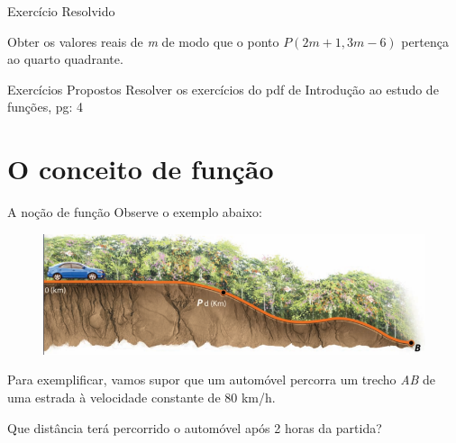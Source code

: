 \documentclass[aspectratio=169,xcolor=dvipsnames]{beamer}
\begin{document}

\begin{frame}{Exercício Resolvido}
  \begin{examples}
    Obter os valores reais de \textit{m} de modo que o ponto $P(2m+1, 3m-6)$ pertença ao quarto quadrante.
  \end{examples}
\end{frame}



\begin{frame}{Exercícios Propostos}
  Resolver os exercícios do pdf de Introdução ao estudo de funções, pg: 4
\end{frame}


\section{O conceito de função}

\begin{frame}{A noção de função}
  Observe o exemplo abaixo:
  \begin{figure}[htb!]
    \centering
    \includegraphics[width=.8\linewidth]{figures/3.png}
  \end{figure}
  Para exemplificar, vamos supor que um automóvel percorra um trecho \textit{AB} de uma estrada à velocidade constante de 
  80 km/h. 

  Que distância terá percorrido o automóvel após 2 horas da partida?
  
\end{frame}

\end{document}
